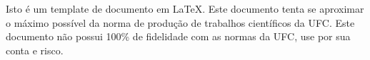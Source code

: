 \begin{resumo}
\noindent
Isto é um template de documento em \LaTeX. Este documento tenta se
aproximar o máximo possível da norma de produção de trabalhos
científicos da UFC. Este documento não possui 100\% de fidelidade
com as normas da UFC, use por sua conta e risco.

\noindent
\palavraschave
\end{resumo}
\pagebreak